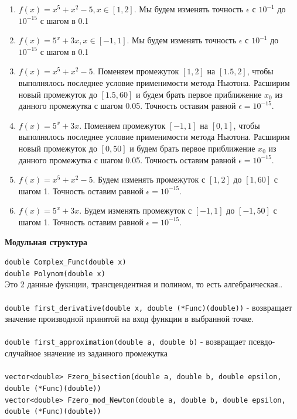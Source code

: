 \documentclass{article}
\begin{document}
	\begin{enumerate}
		\item $f(x) = x^5 + x^2 - 5, x \in [1, 2]$. Мы будем изменять точность $\epsilon$ с $10^{-1}$ до $10^{-15}$ с шагом в 0.1
		\item $f(x) = 5^x + 3x, x \in [-1, 1]$. Мы будем изменять точность $\epsilon$ с $10^{-1}$ до $10^{-15}$ с шагом в 0.1
		\item $f(x) = x^5 + x^2 - 5$. Поменяем промежуток $[1, 2]$ на $[1.5, 2]$, чтобы выполнялось последнее условие применимости метода Ньютона. Расширим новый промежуток до $[1.5, 60]$ и будем брать первое приближение $x_0$ из данного промежутка с шагом 0.05. Точность оставим равной $\epsilon = 10^{-15}$.
		\item $f(x) = 5^x + 3x$. Поменяем промежуток $[-1, 1]$ на $[0, 1]$, чтобы выполнялось последнее условие применимости метода Ньютона. Расширим новый промежуток до $[0, 50]$ и будем брать первое приближение $x_0$ из данного промежутка с шагом 0.05. Точность оставим равной $\epsilon = 10^{-15}$.
		\item $f(x) = x^5 + x^2 - 5$. Будем изменять промежуток с $[1, 2]$ до $[1, 60]$ с шагом 1. Точность оставим равной $\epsilon = 10^{-15}$.
		\item $f(x) = 5^x + 3x$. Будем изменять промежуток с $[-1, 1]$ до $[-1, 50]$ с шагом 1. Точность оставим равной $\epsilon = 10^{-15}$.
	\end{enumerate}
	\newpage
	\begin{center} \textbf{Модульная структура}\end{center}
	\verb|double Complex_Func(double x)|\\
	\verb|double Polynom(double x)|\\
	Это 2 данные фукнции, трансцендентная и полином, то есть алгебраическая..\\
	\\
	\verb|double first_derivative(double x, double (*Func)(double))| - возвращает значение производной принятой на вход функции в выбранной точке.\\
	\\
	\verb|double first_approximation(double a, double b)| - возвращает псевдо-случайное значение из заданного промежутка\\
	\\
	\verb|vector<double> Fzero_bisection(double a, double b, double epsilon,|\\ \verb|double (*Func)(double))|\\
	\verb|vector<double> Fzero_mod_Newton(double a, double b, double epsilon,|\\ \verb|double (*Func)(double))|\\
\end{document}
